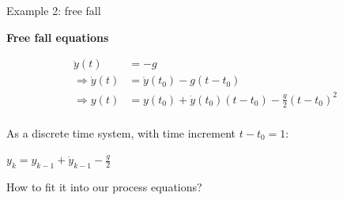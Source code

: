 \documentclass[compress]{beamer}
\begin{document}

\begin{frame}{Example 2: free fall}


 {

    \textbf{Free fall equations}

    \begin{align*}
        \ddot{y}(t) &= -g \\
        \Rightarrow \dot{y}(t) &= \dot{y}(t_0) - g (t-t_0) \\
        \Rightarrow y(t) &= y(t_0) + \dot{y}(t_0) (t-t_0) - \frac{g}{2} (t-t_0)^2 \\
    \end{align*}

     {
    As a discrete time system, with time increment $t-t_0 = 1$:

    \begin{center}
    $y_k = y_{k-1} + \dot{y}_{k-1} - \frac{g}{2}$
    \end{center}

    \alert{How to fit it into our process equations?}
}
}

\end{frame}
\end{document}
